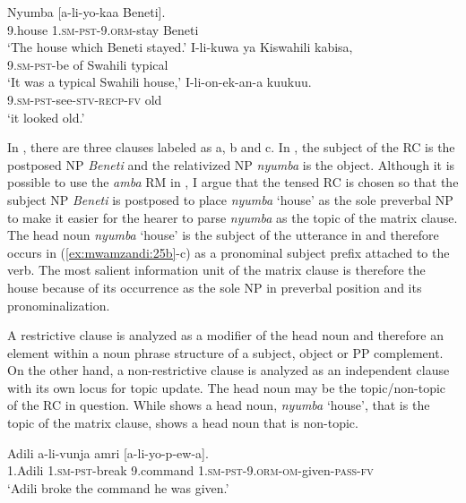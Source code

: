 \documentclass[output=paper,colorlinks,citecolor=brown]{langscibook}
\begin{document}
\ea%
    \label{ex:mwamzandi:25}
    \ea%
    \label{ex:mwamzandi:25a}
    \gll    Nyumba [a-li-yo-kaa Beneti].\\
            9.house \textsc{1.sm-pst-9.orm-}stay Beneti\\
    \glt    ‘The house which Beneti stayed.’
    \ex%
    \label{ex:mwamzandi:25b}
    \gll    I-li-kuwa ya Kiswahili kabisa,\\
            \textsc{9.sm-pst-}be of Swahili typical\\
    \glt    ‘It was a typical Swahili house,’
    \ex%
    \label{ex:mwamzandi:25c}
    \gll    I-li-on-ek-an-a kuukuu.\\
            \textsc{9.sm-pst-}see\textsc{-stv-recp-fv} old\\
    \glt    ‘it looked old.’
    \z
\z

In , there are three clauses labeled as a, b and c. In , the subject of the RC is the postposed NP \textit{Beneti} and the relativized NP \textit{nyumba} is the object. Although it is possible to use the \textit{amba} RM in , I argue that the tensed RC is chosen so that the subject NP \textit{Beneti} is postposed to place \textit{nyumba} ‘house’ as the sole preverbal NP to make it easier for the hearer to parse \textit{nyumba} as the topic of the matrix clause. The head noun \textit{nyumba} ‘house’ is the subject of the utterance in  and therefore occurs in (\ref{ex:mwamzandi:25b}-c) as a pronominal subject prefix attached to the verb. The most salient information unit of the matrix clause is therefore the house because of its occurrence as the sole NP in preverbal position and its pronominalization.

A restrictive clause is analyzed as a modifier of the head noun and therefore an element within a noun phrase structure of a subject, object or PP complement. On the other hand, a non-restrictive clause is analyzed as an independent clause with its own locus for topic update. The head noun may be the topic/non-topic of the RC in question. While  shows a head noun, \textit{nyumba} ‘house’, that is the topic of the matrix clause,  shows a head noun that is non-topic.

\ea%
    \label{ex:mwamzandi:26}
    \gll    Adili a-li-vunja amri [a-li-yo-p-ew-a].\\
            1.Adili \textsc{1.sm-pst-}break 9.command \textsc{1.sm-pst-9.orm-om-}given\textsc{-pass-fv}\\
    \glt    ‘Adili broke the command he was given.’
\z
\end{document}
